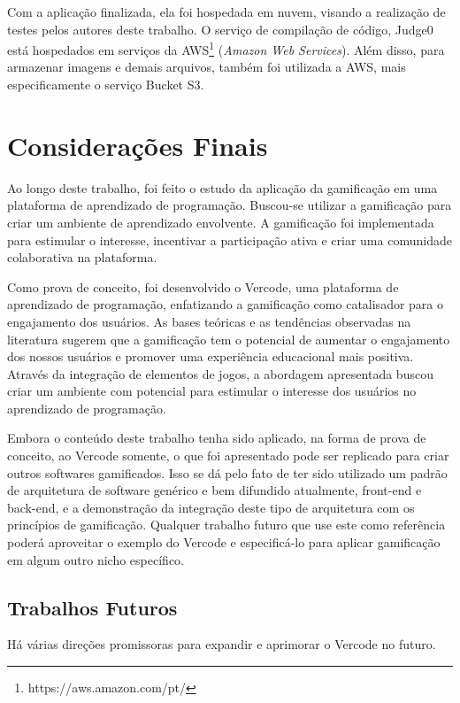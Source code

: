 \documentclass[12pt]{article}
\begin{document}
Com a aplicação finalizada, ela foi hospedada em nuvem, visando a realização de testes pelos autores deste trabalho. O serviço de compilação de código, Judge0 está hospedados em serviços da AWS\footnote{https://aws.amazon.com/pt/} (\textit{Amazon Web Services}). Além disso, para armazenar imagens e demais arquivos, também foi utilizada a AWS, mais especificamente o serviço Bucket S3.

\section{Considerações Finais} \label{sec:consideracoes_finais}

Ao longo deste trabalho, foi feito o estudo da aplicação da gamificação em uma plataforma de aprendizado de programação. Buscou-se utilizar a gamificação para criar um ambiente de aprendizado envolvente. A gamificação foi implementada para estimular o interesse, incentivar a participação ativa e criar uma comunidade colaborativa na plataforma.

Como prova de conceito, foi desenvolvido  o Vercode, uma plataforma de aprendizado de programação, enfatizando a gamificação como catalisador para o engajamento dos usuários. As bases teóricas e as tendências observadas na literatura sugerem que a gamificação tem o potencial de aumentar o engajamento dos nossos usuários e promover uma experiência educacional mais positiva. Através da integração de elementos de jogos, a abordagem apresentada buscou criar um ambiente com potencial para estimular  o interesse dos usuários no aprendizado de programação.

Embora o conteúdo deste trabalho tenha sido aplicado, na forma de prova de conceito, ao Vercode somente, o que foi apresentado pode ser replicado para criar outros softwares gamificados. Isso se dá pelo fato de ter sido utilizado um padrão de arquitetura de software genérico e bem difundido atualmente, front-end e back-end, e a demonstração da integração deste tipo de arquitetura com os princípios de gamificação. Qualquer trabalho futuro que use este como referência poderá aproveitar o exemplo do Vercode e especificá-lo para aplicar gamificação em algum outro nicho específico.

\subsection{Trabalhos Futuros} \label{sec:futuro}

Há várias direções promissoras para expandir e aprimorar o Vercode no futuro. 
\end{document}
